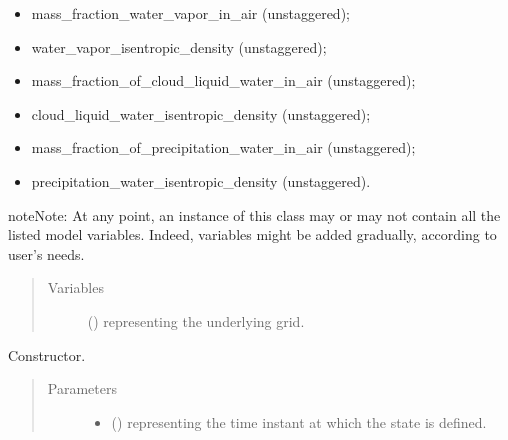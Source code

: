 \documentclass[letterpaper,10pt,english]{sphinxmanual}
\begin{document}
\begin{fulllineitems}
\begin{itemize}
\item {} 
mass\_fraction\_water\_vapor\_in\_air (unstaggered);

\item {} 
water\_vapor\_isentropic\_density (unstaggered);

\item {} 
mass\_fraction\_of\_cloud\_liquid\_water\_in\_air (unstaggered);

\item {} 
cloud\_liquid\_water\_isentropic\_density (unstaggered);

\item {} 
mass\_fraction\_of\_precipitation\_water\_in\_air (unstaggered);

\item {} 
precipitation\_water\_isentropic\_density (unstaggered).

\end{itemize}

\begin{sphinxadmonition}{note}{Note:}
At any point, an instance of this class may or may not contain all the listed model variables. Indeed, variables
might be added gradually, according to user’s needs.
\end{sphinxadmonition}
\begin{quote}\begin{description}
\item[{Variables}] \leavevmode
{} () \textendash{} {\hyperref[\detokenize{api:grids.grid_xyz.GridXYZ}]{}} representing the underlying grid.

\end{description}\end{quote}

\begin{fulllineitems}
\label{\detokenize{api:storages.state_isentropic.StateIsentropic.__init__}}
Constructor.
\begin{quote}\begin{description}
\item[{Parameters}] \leavevmode\begin{itemize}
\item {} 
 () \textendash{}  representing the time instant at which the state is defined.


\end{itemize}
\end{description}
\end{quote}
\end{fulllineitems}
\end{fulllineitems}
\end{document}
